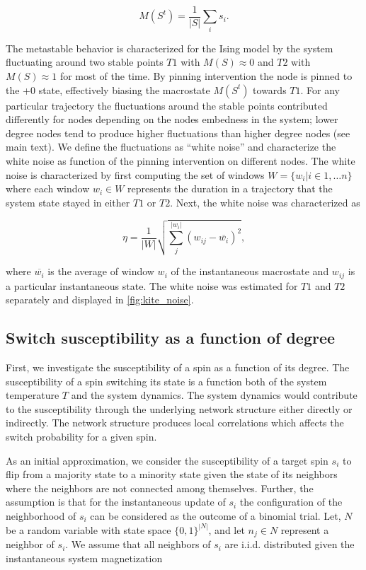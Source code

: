 \documentclass[a4paper, 11pt, twocolumn]{article}
\begin{document}
\begin{equation}
\label{}
M(S^t) = \frac{1}{|S|} \sum_i s_i.
\end{equation}

The metastable behavior is characterized for the Ising model
by the system fluctuating around two stable points $T1$ with
$M(S) \approx 0$ and $T2$ with $M(S) \approx 1$ for most of the time. By
pinning intervention  the node  is pinned  to the  +0 state,
effectively  biasing the  macrostate $M(S^t)$  towards $T1$.
For any  particular trajectory  the fluctuations  around the
stable points contributed differently for nodes depending on
the nodes embedness  in the system; lower  degree nodes tend
to produce higher fluctuations than higher degree nodes (see
main text). We define the  fluctuations as ``white noise'' and
characterize  the white  noise  as function  of the  pinning
intervention  on   different  nodes.  The  white   noise  is
characterized by  first computing  the set  of windows  $W =
\{w_i  | i\in  1,  \dots  n\}$ where  each  window  $w_i \in  W$
represents  the duration  in  a trajectory  that the  system
state stayed  in either $T1$  or $T2$. Next, the  white noise
was characterized as

\begin{equation}
\label{}
\eta = \frac{1}{|W|} \sqrt{ \sum_j^{|w_i|} (w_{ij} - \overline{w_i})^2},
\end{equation}

where $\overline{w_i}$  is the  average of window  $w_i$ of
the instantaneous  macrostate and  $w_{ij}$ is  a particular
instantaneous state. The white  noise was estimated for $T1$
and $T2$ separately and displayed in \cref{fig:kite_noise}.

\subsection{Switch susceptibility as a function of degree}
\label{sec:org009e10c}
First,  we investigate  the susceptibility  of a  spin as  a
function  of  its  degree.  The  susceptibility  of  a  spin
switching  its  state  is  a function  both  of  the  system
temperature $T$ and the system dynamics. The system dynamics
would   contribute  to   the   susceptibility  through   the
underlying network structure  either directly or indirectly.
The  network  structure  produces local  correlations  which
affects the switch probability for a given spin.

As an initial approximation,  we consider the susceptibility
of a  target spin $s_i$ to  flip from a majority  state to a
minority state  given the state  of its neighbors  where the
neighbors are  not connected among themselves.  Further, the
assumption is that for the instantaneous update of $s_i$ the
configuration of the neighborhood of $s_i$ can be considered
as the  outcome of a  binomial trial.  Let, $N$ be  a random
variable with state space $\{0,  1\}^{|N|}$, and let $n_j \in N$
represent a neighbor of $s_i$.  We assume that all neighbors
of  $s_i$ are  i.i.d.  distributed  given the  instantaneous
system magnetization
\end{document}
